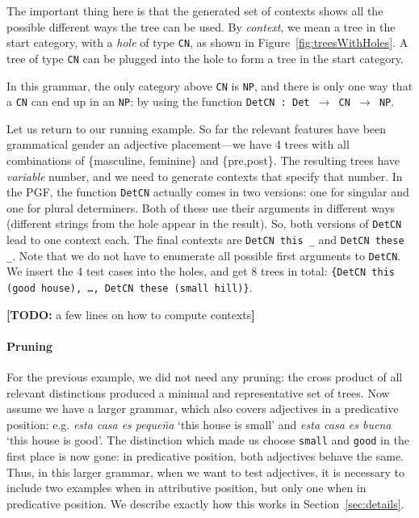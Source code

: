 \documentclass[11pt]{article}
\def\t#1{\texttt{#1}}
\newcommand{\todo}[1]{{\color{cyan}\textbf{[TODO: }#1\textbf{]}}}
\begin{document}
The important thing here is that the generated set of contexts shows all the possible different ways the tree can be used. By \emph{context}, we mean a tree in
the start category, with a \emph{hole} of type \t{CN}, as shown in
Figure~\ref{fig:treesWithHoles}. A tree of type \t{CN} can be plugged into the hole to form a tree in the start category.

In this grammar, the only category above \t{CN} is \t{NP}, and there is only
one way that a \t{CN} can end up in an \t{NP}: by using the function
\t{DetCN : Det $\rightarrow$ CN $\rightarrow$ NP}. 

Let us return to our running example. So far the relevant features have
been grammatical gender an adjective placement---we have 4 trees with
all combinations of \{masculine, feminine\} and \{pre,post\}. The
resulting trees have \emph{variable} number, and we need to generate contexts that specify that number. In the PGF, the function \t{DetCN} actually comes in two versions: one for singular and one for plural determiners. Both of these use their arguments in different ways (different strings from the hole appear in the result). So, both versions of \t{DetCN} lead to one context each. The final contexts are \verb|DetCN this _| and  \verb|DetCN these _|. Note that we do not have to enumerate all possible first arguments to \t{DetCN}. We insert the 4 test
cases into the holes, and get 8 trees in total: \t{\{DetCN this (good
  house), \dots, DetCN these (small hill)\}}. 

\todo{a few lines on how to compute contexts}

\paragraph{Pruning} For the previous example, we did not need any pruning: the cross
product of all relevant distinctions produced a minimal and
representative set of trees. Now assume we have a larger grammar,
which also covers adjectives in a predicative position:
e.g. \emph{esta casa es peque\~{n}a} `this house is small' and
\emph{esta casa es buena} `this house is good'. The distinction which
made us choose \t{small} and \t{good} in the first place is now gone:
in predicative position, both adjectives behave the same. Thus, in
this larger grammar, when we want to test adjectives, it is necessary
to include two examples when in attributive position, but only one
when in predicative position. We describe exactly how this works in
Section~\ref{sec:details}. 
\end{document}
